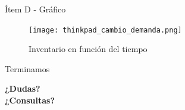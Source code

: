 \documentclass{beamer}
\begin{document}
\begin{frame}{Ítem D - Gráfico}
\begin{figure}
    \centering
    \texttt{[image: thinkpad\_cambio\_demanda.png]}
    \caption{Inventario en función del tiempo}
\end{figure}
\end{frame}

\begin{frame}{Terminamos}
    \begin{center}
        \Large{\textbf{¿Dudas?\\¿Consultas?}}
    \end{center}
\end{frame}
\end{document}
